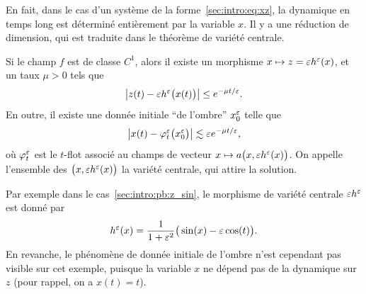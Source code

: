 En fait, dans le cas d'un système de la forme~\eqref{sec:intro:eq:xz}, la dynamique en temps long est déterminé entièrement par la variable $x$. Il y a une réduction de dimension, qui est traduite dans le théorème de variété centrale. 
\begin{FRtheorem*}
    Si le champ $f$ est de classe $C^1$, alors il existe un morphisme $x \mapsto z = \varepsilon h^{\varepsilon}(x)$, et un taux $\mu > 0$ tels que 
    \begin{equation*}
        \left| z(t) - \varepsilon h^{\varepsilon}\big( x(t) \big) \right|
        \leq e^{-\mu t/\varepsilon} .
    \end{equation*}
    En outre, il existe une donnée initiale \enquote{de l'ombre} $x_0^{\varepsilon}$ telle que 
    \begin{equation*}
        \big| x(t) - \varphi_t^{\varepsilon} \big( x_0^{\varepsilon} \big) \big| 
        \lesssim \varepsilon e^{-\mu t/\varepsilon} , 
    \end{equation*}
    où $\varphi^{\varepsilon}_t$ est le $t$-flot associé au champs de vecteur $x \mapsto a\big(x, \varepsilon h^{\varepsilon}(x) \big)$. On appelle l'ensemble des $\big( x, \varepsilon h^{\varepsilon}(x) \big)$ la variété centrale, qui attire la solution. 
\end{FRtheorem*}

Par exemple dans le cas~\eqref{sec:intro:pb:z_sin}, le morphisme de variété centrale $\varepsilon h^{\varepsilon}$ est donné par 
\begin{equation*}
    h^{\varepsilon}(x) 
    = \frac{1}{1 + \varepsilon^2} \big( \sin(x) - \varepsilon \cos(t) \big) .
\end{equation*}
En revanche, le phénomène de donnée initiale de l'ombre n'est cependant pas visible sur cet exemple, puisque la variable $x$ ne dépend pas de la dynamique sur $z$ (pour rappel, on a $x(t) = t$). 


